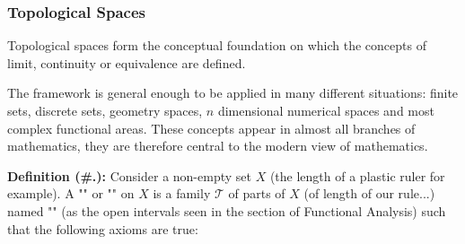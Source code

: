 	\subsubsection{Topological Spaces}
	Topological spaces form the conceptual foundation on which the concepts of limit, continuity or equivalence are defined.
	
	The framework is general enough to be applied in many different situations: finite sets, discrete sets, geometry spaces, $n$ dimensional numerical spaces and most complex functional areas. These concepts appear in almost all branches of mathematics, they are therefore central to the modern view of mathematics.
	
	\textbf{Definition (\#\thesection.\mydef):} Consider a non-empty set $X$ (the length of a plastic ruler for example). A "" or "" on $X$ is a family $\mathcal{T}$ of parts of $X$ (of length of our rule...) named ""  (as the open intervals seen in the section  of Functional Analysis) such that the following axioms are true:

